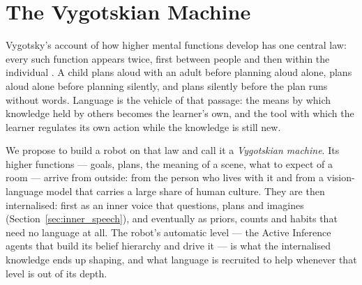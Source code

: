 %
%     
%     
%     

\section{The Vygotskian Machine}
\label{sec:vygotskian}

Vygotsky's account of how higher mental functions develop has one central law: every such function appears twice,
first between people and then within the individual \cite{vygotsky1978mind}. A child plans aloud with an adult before
planning aloud alone, plans aloud alone before planning silently, and plans silently before the plan runs without
words. Language is the vehicle of that passage: the means by which knowledge held by others becomes the learner's
own, and the tool with which the learner regulates its own action while the knowledge is still new.

We propose to build a robot on that law and call it a \emph{Vygotskian machine}. Its higher functions --- goals,
plans, the meaning of a scene, what to expect of a room --- arrive from outside: from the person who lives with it and
from a vision-language model that carries a large share of human culture. They are then internalised: first as an
inner voice that questions, plans and imagines (Section~\ref{sec:inner_speech}), and eventually as priors, counts
and habits that need no language at all. The robot's automatic level --- the Active Inference agents that build its
belief hierarchy and drive it --- is what the internalised knowledge ends up shaping, and what language is recruited
to help whenever that level is out of its depth.

